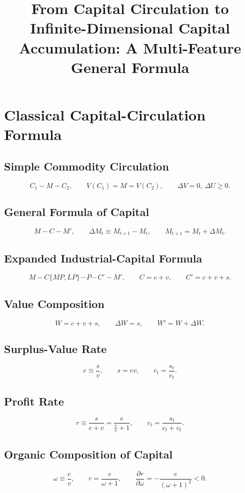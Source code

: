 \documentclass[11pt]{article}
\title{From Capital Circulation to Infinite-Dimensional Capital Accumulation: A Multi-Feature General Formula}
\author{}
\date{}
\begin{document}
\maketitle

\section{Classical Capital-Circulation Formula}

\subsection{Simple Commodity Circulation}
\[
C_1-M-C_2,
\qquad V(C_1)=M=V(C_2),
\qquad \Delta V=0,\ \Delta U\ge 0.
\]

\subsection{General Formula of Capital}
\[
M-C-M',
\qquad \Delta M_t\equiv M_{t+1}-M_t,
\qquad M_{t+1}=M_t+\Delta M_t.
\]

\subsection{Expanded Industrial-Capital Formula}
\[
M-C\{MP,LP\}\,\cdots P\cdots\,C'-M',
\qquad C=c+v,
\qquad C'=c+v+s.
\]

\subsection{Value Composition}
\[
W=c+v+s,
\qquad \Delta W=s,
\qquad W'=W+\Delta W.
\]

\subsection{Surplus-Value Rate}
\[
e\equiv \frac{s}{v},
\qquad s=e v,
\qquad e_t=\frac{s_t}{v_t}.
\]

\subsection{Profit Rate}
\[
r\equiv \frac{s}{c+v}=\frac{e}{\frac{c}{v}+1},
\qquad r_t=\frac{s_t}{c_t+v_t}.
\]

\subsection{Organic Composition of Capital}
\[
\omega\equiv\frac{c}{v},
\qquad r=\frac{e}{\omega+1},
\qquad \frac{\partial r}{\partial \omega}=-\frac{e}{(\omega+1)^2}<0.
\]
\end{document}
